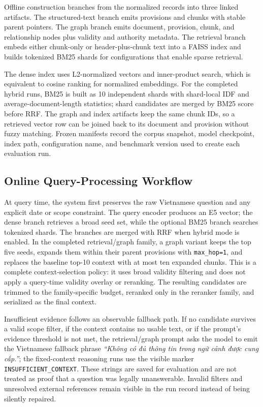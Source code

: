 Offline construction branches from the normalized records into three linked
artifacts. The structured-text branch emits provisions and chunks with stable
parent pointers. The graph branch emits document, provision, chunk, and
relationship nodes plus validity and authority metadata. The retrieval branch
embeds either chunk-only or header-plus-chunk text into a FAISS index and
builds tokenized BM25 shards for configurations that enable sparse retrieval.

The dense index uses L2-normalized vectors and inner-product search, which is
equivalent to cosine ranking for normalized embeddings. For the completed
hybrid runs, BM25 is built as 10 independent shards with shard-local IDF and
average-document-length statistics; shard candidates are merged by BM25 score
before RRF. The graph and index artifacts keep the same chunk IDs, so a
retrieved vector row can be joined back to its document and provision without
fuzzy matching. Frozen manifests record the corpus snapshot, model
checkpoint, index path, configuration name, and benchmark version used to
create each evaluation run.

\subsection{Online Query-Processing Workflow}
\label{sec:online-query}

At query time, the system first preserves the raw Vietnamese question and any
explicit date or scope constraint. The query encoder produces an E5 vector;
the dense branch retrieves a broad seed set, while the optional BM25 branch
searches tokenized shards. The branches are merged with RRF when hybrid mode
is enabled. In the completed retrieval/graph family, a graph variant keeps
the top five seeds, expands them within their parent provisions with
\texttt{max\_hop=1}, and replaces the baseline top-10 context with at most
ten expanded chunks. This is a complete context-selection policy: it uses
broad validity filtering and does not apply a query-time validity overlay or
reranking. The resulting candidates are trimmed to the family-specific
budget, reranked only in the reranker family, and serialized as the final
context.

Insufficient evidence follows an observable fallback path. If no candidate
survives a valid scope filter, if the context contains no usable text, or if
the prompt's evidence threshold is not met, the retrieval/graph prompt asks
the model to emit the Vietnamese fallback phrase
\textit{``Không có đủ thông tin trong ngữ cảnh được cung cấp.''}; the
fixed-context reasoning runs use the visible marker
\texttt{INSUFFICIENT\_CONTEXT}. These strings are saved for evaluation and
are not treated as proof that a question was legally unanswerable. Invalid
filters and unresolved external references remain visible in the run record
instead of being silently repaired.

